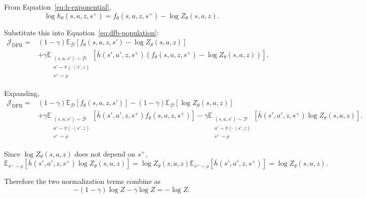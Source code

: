 \documentclass[11pt]{article}
\begin{document}
From Equation~\eqref{eq:h-exponential},
\begin{equation}
    \log h_\theta(s,a,z,s^+) = f_\theta(s,a,z,s^+) - \log Z_\theta(s,a,z).
    \label{eq:log-h}
\end{equation}

Substitute this into Equation~\eqref{eq:dfb-population}:
\begin{align}
    \mathcal J_{\mathrm{DFB}} ={}& (1-\gamma) \mathbb E_{\mathcal D} \left[ f_\theta(s,a,z,s') - \log Z_\theta(s,a,z) \right] \nonumber\\
                                &+ \gamma \mathbb E_{\substack{ (s,a,s')\sim\mathcal D\\ a'\sim\bar\pi(\cdot\mid s',z)\\ s^+\sim\rho }}
                                        \left[ \bar h(s',a',z,s^+) \left( f_\theta(s,a,z,s^+) - \log Z_\theta(s,a,z) \right) \right].
    \label{eq:dfb-substitution}
\end{align}

Expanding,
\begin{align}
    \mathcal J_{\mathrm{DFB}} ={}& (1-\gamma) \mathbb E_{\mathcal D} [f_\theta(s,a,z,s')]
                                - (1-\gamma) \mathbb E_{\mathcal D} [\log Z_\theta(s,a,z)] \nonumber\\
                                &+ \gamma \mathbb E_{\substack{ (s,a,s')\sim\mathcal D\\ a'\sim\bar\pi(\cdot\mid s',z)\\ s^+\sim\rho }}
                                        \left[ \bar h(s',a',z,s^+) f_\theta(s,a,z,s^+) \right]
                                - \gamma \mathbb E_{\substack{ (s,a,s')\sim\mathcal D\\ a'\sim\bar\pi(\cdot\mid s',z)\\ s^+\sim\rho }}
                                        \left[ \bar h(s',a',z,s^+) \log Z_\theta(s,a,z) \right].
    \label{eq:dfb-four-terms}
\end{align}

Since $\log Z_\theta(s,a,z)$ does not depend on $s^+$,
\begin{equation}
    \mathbb E_{s^+\sim\rho} \left[ \bar h(s',a',z,s^+) \log Z_\theta(s,a,z) \right] = \log Z_\theta(s,a,z) \mathbb E_{s^+\sim\rho} \left[ \bar h(s',a',z,s^+) \right]
    = \log Z_\theta(s,a,z).
\end{equation}

Therefore the two normalization terms combine as
\begin{equation}
-(1-\gamma)\log Z - \gamma\log Z = -\log Z.
\end{equation}
\end{document}
